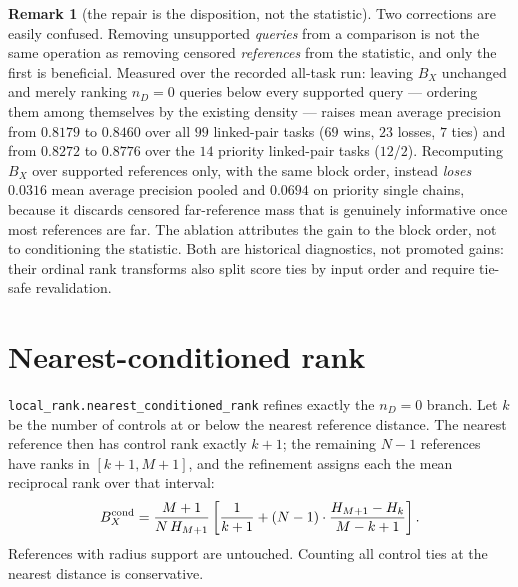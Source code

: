 \documentclass[10pt,a4paper]{article}
\theoremstyle{definition}
\newtheorem{remark}{Remark}
\newcommand{\code}[1]{\texttt{\small #1}}
\begin{document}
\begin{remark}[the repair is the disposition, not the statistic]\label{rem:disposition}
Two corrections are easily confused. Removing unsupported \emph{queries} from a comparison is not
the same operation as removing censored \emph{references} from the statistic, and only the first is
beneficial. Measured over the recorded all-task run: leaving $B_X$ unchanged and merely ranking
$n_D=0$ queries below every supported query --- ordering them among themselves by the existing
density --- raises mean average precision from $0.8179$ to $0.8460$ over all $99$ linked-pair tasks
($69$ wins, $23$ losses, $7$ ties) and from $0.8272$ to $0.8776$ over the $14$ priority linked-pair
tasks ($12$/$2$). Recomputing $B_X$ over supported references only, with the same block order,
instead \emph{loses} $0.0316$ mean average precision pooled and $0.0694$ on priority single chains,
because it discards censored far-reference mass that is genuinely informative once most references
are far. The ablation attributes the gain to the block order, not to conditioning the statistic.
Both are historical diagnostics, not promoted gains: their ordinal rank transforms also split
score ties by input order and require tie-safe revalidation.
\end{remark}

\section{Nearest-conditioned rank}\label{sec:ncr}
\code{local\_rank.nearest\_conditioned\_rank} refines exactly the $n_D=0$ branch. Let $k$ be the
number of controls at or below the nearest reference distance. The nearest reference then has
control rank exactly $k+1$; the remaining $N-1$ references have ranks in $[k+1,M+1]$, and the
refinement assigns each the mean reciprocal rank over that interval:
\[
B_X^{\rm cond}=\frac{M+1}{N\,H_{M+1}}\left[\frac1{k+1}+(N-1)\cdot\frac{H_{M+1}-H_{k}}{M-k+1}\right].
\]
References with radius support are untouched. Counting all control ties at the nearest distance is
conservative.
\end{document}
